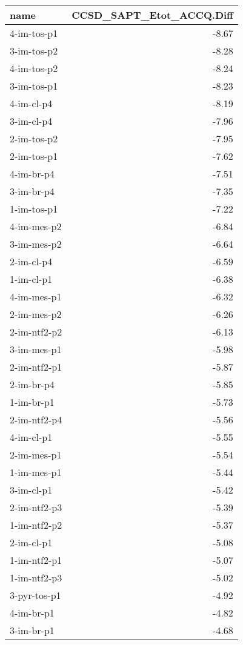 \documentclass[a4paper]{article}
\begin{document}
\begin{table}[ht]
\centering
\footnotesize
\begin{tabular}{lr}
  \hline
name & CCSD\_SAPT\_Etot\_ACCQ.Diff \\ 
  \hline
4-im-tos-p1 & -8.67 \\ 
  3-im-tos-p2 & -8.28 \\ 
  4-im-tos-p2 & -8.24 \\ 
  3-im-tos-p1 & -8.23 \\ 
  4-im-cl-p4 & -8.19 \\ 
  3-im-cl-p4 & -7.96 \\ 
  2-im-tos-p2 & -7.95 \\ 
  2-im-tos-p1 & -7.62 \\ 
  4-im-br-p4 & -7.51 \\ 
  3-im-br-p4 & -7.35 \\ 
  1-im-tos-p1 & -7.22 \\ 
  4-im-mes-p2 & -6.84 \\ 
  3-im-mes-p2 & -6.64 \\ 
  2-im-cl-p4 & -6.59 \\ 
  1-im-cl-p1 & -6.38 \\ 
  4-im-mes-p1 & -6.32 \\ 
  2-im-mes-p2 & -6.26 \\ 
  2-im-ntf2-p2 & -6.13 \\ 
  3-im-mes-p1 & -5.98 \\ 
  2-im-ntf2-p1 & -5.87 \\ 
  2-im-br-p4 & -5.85 \\ 
  1-im-br-p1 & -5.73 \\ 
  2-im-ntf2-p4 & -5.56 \\ 
  4-im-cl-p1 & -5.55 \\ 
  2-im-mes-p1 & -5.54 \\ 
  1-im-mes-p1 & -5.44 \\ 
  3-im-cl-p1 & -5.42 \\ 
  2-im-ntf2-p3 & -5.39 \\ 
  1-im-ntf2-p2 & -5.37 \\ 
  2-im-cl-p1 & -5.08 \\ 
  1-im-ntf2-p1 & -5.07 \\ 
  1-im-ntf2-p3 & -5.02 \\ 
  3-pyr-tos-p1 & -4.92 \\ 
  4-im-br-p1 & -4.82 \\ 
  3-im-br-p1 & -4.68 \\ 

\end{tabular}
\end{table}
\end{document}

